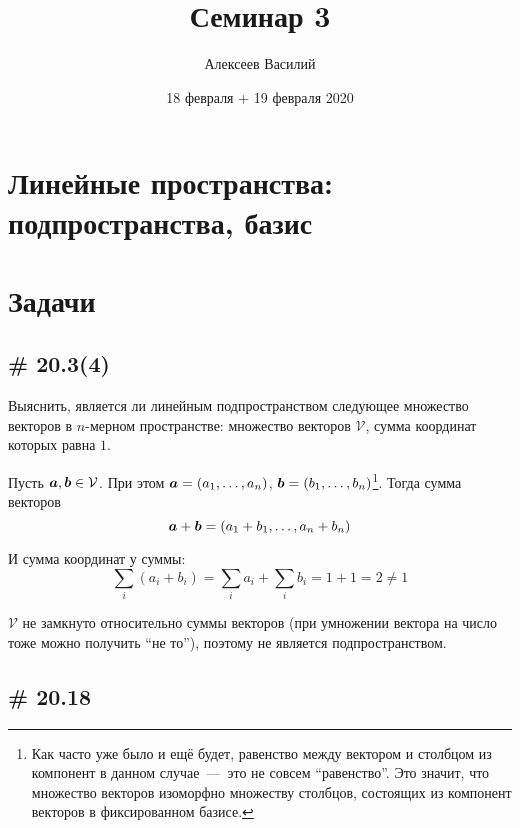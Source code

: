 \documentclass[a4paper,12pt]{article}
\author{Алексеев Василий}
\title{Семинар 3}
\date{18 февраля + 19 февраля 2020}
\begin{document}
  \maketitle
  
  \tableofcontents

  \thispagestyle{empty}
  
  \newpage
  


  \section{Линейные пространства: подпространства, базис}
  
  \section{Задачи}
  
  
  \subsection{\# 20.3(4)}
  
  Выяснить, является ли линейным подпространством следующее множество векторов в $n$-мерном пространстве:
  множество векторов $\mathcal V$, сумма координат которых равна $1$.
  
  \begin{solution}
    Пусть $\boldsymbol a, \boldsymbol b \in \mathcal V$.
    При этом $\bds a \hm= (a_1, \ldots, a_n)$, $\bds b \hm= (b_1, \ldots, b_n)$\footnote{Как часто уже было и ещё будет, равенство между вектором и столбцом из компонент в данном случае~---~это не совсем ``равенство''. Это значит, что множество векторов изоморфно множеству столбцов, состоящих из компонент векторов в фиксированном базисе.}.
    Тогда сумма векторов
    \[
      \boldsymbol a + \boldsymbol b = (a_1 + b_1, \ldots, a_n + b_n)
    \]
    
    И сумма координат у суммы:
    \[
      \sum_i (a_i + b_i) = \sum_i a_i + \sum_i b_i = 1 + 1 = 2 \not= 1
    \]
    
    $\mathcal V$ не замкнуто относительно суммы векторов (при умножении вектора на число тоже можно получить ``не то''), поэтому не является подпространством.
  \end{solution}
  
  
  \subsection{\# 20.18}
  
\end{document}
